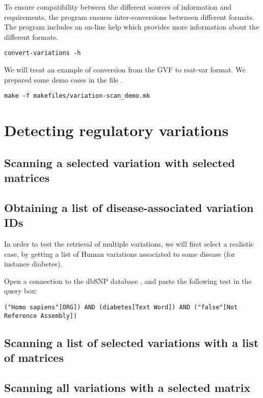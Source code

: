 To ensure compatibility between the different sources of information
and \RSAT requirements, the program 
ensures inter-conversions betwneen different formats. The program
includes an on-line help which provides more information about the
different formats.

\begin{lstlisting}
convert-variations -h
\end{lstlisting}


We will treat an example of conversion from the GVF to rsat-var
format. We prepared some demo cases in the file
.

\begin{lstlisting}
make -f makefiles/variation-scan_demo.mk
\end{lstlisting}
\tbw

\section{Detecting regulatory variations}

\subsection{Scanning a selected variation with selected matrices}

\tbw

\subsection{Obtaining a list of disease-associated variation IDs}

In order to test the retrieval of multiple variations, we will first
select a realistic case, by getting a list of Human variations
associated to some disease (for instance diabetes).

Open a connection to the dbSNP database
, and paste the following
test in the query box:

\begin{lstlisting}
("Homo sapiens"[ORG]) AND (diabetes[Text Word]) AND ("false"[Not Reference Assembly])
\end{lstlisting}

\tbw


\subsection{Scanning a list of selected variations with a list of matrices}

\tbw

\subsection{Scanning all variations with a selected matrix}

\tbw



